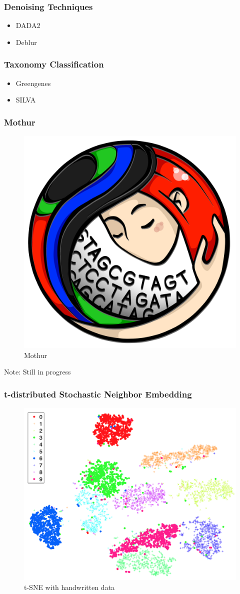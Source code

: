 \documentclass{beamer}
\begin{document}
    \begin{frame}
        \frametitle{Denoising Techniques}

        \begin{itemize}
            \item DADA2 \cite{DADA2}
            \item Deblur \cite{Deblur1}
        \end{itemize}
    \end{frame}

    \begin{frame}
        \frametitle{Taxonomy Classification}

        \begin{itemize}
            \item Greengenes \cite{greengenes1}
            \item SILVA \cite{silva1, silva2}
        \end{itemize}
    \end{frame}

    \begin{frame}
        \frametitle{Mothur}

        \begin{figure}[h!]
            \includegraphics[width=0.3 \linewidth]{figures/mothur.png}
            \caption{Mothur}
        \end{figure}

        Note: Still in progress
    \end{frame}

    \begin{frame}
        \frametitle[t-SNE]{t-distributed Stochastic Neighbor Embedding}

        \begin{figure}[h!]
            \includegraphics[width=0.6 \linewidth]{figures/tsne.png}
            \caption{t-SNE with handwritten data \protect \cite{tsne1}}
        \end{figure}
    \end{frame}
\end{document}
